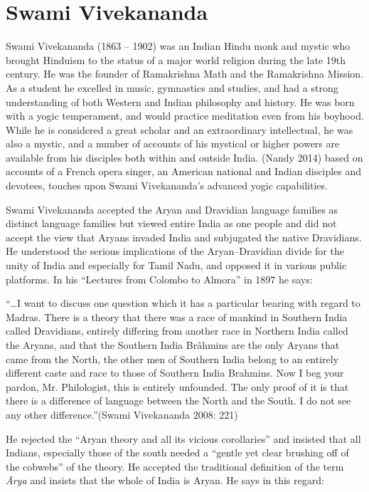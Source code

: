 \section*{Swami Vivekananda}

Swami Vivekananda (1863 – 1902) was an Indian Hindu monk and mystic who brought Hinduism to the status of a major world religion during the late 19th century. He was the founder of Ramakrishna Math and the Ramakrishna Mission. As a student he excelled in music, gymnastics and studies, and had a strong understanding of both Western and Indian philosophy and history. He was born with a yogic temperament, and would practice meditation even from his boyhood. While he is considered a great scholar and an extraordinary intellectual, he was also a mystic, and a number of accounts of his mystical or higher powers are available from his disciples both within and outside India. (Nandy 2014) based on accounts of a French opera singer, an American national and Indian disciples and devotees, touches upon Swami Vivekananda’s advanced yogic capabilities.

Swami Vivekananda accepted the Aryan and Dravidian language families as distinct language families but viewed entire India as one people and did not accept the view that Aryans invaded India and subjugated the native Dravidians. He understood the serious implications of the Aryan–Dravidian divide for the unity of India and especially for Tamil Nadu, and opposed it in various public platforms. In his “Lectures from Colombo to Almora” in 1897 he says:

\begin{myquote}
“…I want to discuss one question which it has a particular bearing with regard to Madras. There is a theory that there was a race of mankind in Southern India called Dravidians, entirely differing from another race in Northern India called the Aryans, and that the Southern India Brâhmins are the only Aryans that came from the North, the other men of Southern India belong to an entirely different caste and race to those of Southern India Brahmins. Now I beg your pardon, Mr. Philologist, this is entirely unfounded. The only proof of it is that there is a difference of language between the North and the South. I do not see any other difference.”(Swami Vivekananda 2008: 221)
\end{myquote}

He rejected the “Aryan theory and all its vicious corollaries” and insisted that all Indians, especially those of the south needed a “gentle yet clear brushing off of the cobwebs” of the theory. He accepted the traditional definition of the term \textit{Ārya} and insists that the whole of India is Aryan. He says in this regard:

